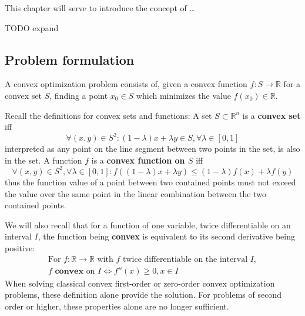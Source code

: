 \documentclass[../convex_optimization.tex]{subfiles}
\begin{document}
This chapter will serve to introduce the concept of \ldots

TODO expand

\subsection{Problem formulation}
A convex optimization problem consists of, given a convex function
$f: S \to \mathbb R$ for a convex set $S$, finding
a point $x_0 \in S$ which minimizes the value $f(x_0) \in \mathbb R$.

Recall the definitions for convex sets and functions:
A set $S \subset \mathbb R^n$ is a \textbf{convex set} iff
\begin{equation}
    \forall (x, y) \in S^2: (1-\lambda)x + \lambda y \in S,
    \forall \lambda \in [0, 1]
    \label{convex_set}
\end{equation}
interpreted as any point on the line segment between two points in the set,
is also in the set.
A function $f$ is a \textbf{convex function on $S$} iff
\begin{equation}
    \forall (x, y) \in S^2, \forall \lambda \in [0, 1]:
    f((1-\lambda)x + \lambda y) \leq (1-\lambda)f(x) + \lambda f(y)
    \label{convex_function}
\end{equation}
thus the function value of a point between two contained points must
not exceed the value over the same point in the linear combination between the two contained points.

We will also recall that for a function of one variable,
twice differentiable on an interval $I$,
the function being \textbf{convex} is equivalent to its second derivative
being positive:
\begin{equation} \label{convex_corollary}
\begin{gathered}
    \text{For } f: \mathbb R \to \mathbb R
    \text{ with $f$ twice differentiable on the interval $I$}, \\
f \textbf{ convex}\text{ on } I \iff f''(x) \geq 0, x \in I
\end{gathered}
\end{equation}
When solving classical convex first-order or zero-order convex
optimization problems, these definition alone provide the solution.
For problems of second order or higher, these properties alone are
no longer sufficient.
\end{document}
